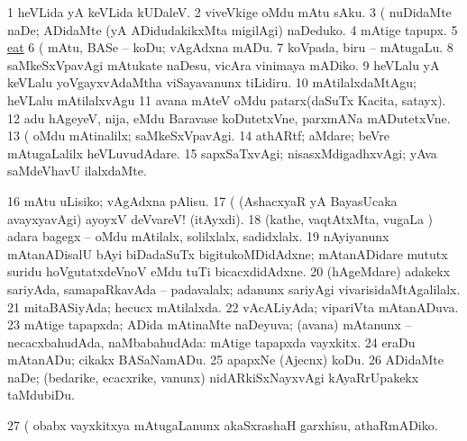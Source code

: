 \noindent
\gl{\pagu}
\expl{}
\bmng
\bnum
\num{1}  heVLida yA keVLida kUDaleV. 
\num{2}  viveVkige oMdu mAtu sAku. 
\num{3}  (  nuDidaMte naDe; ADidaMte (yA ADidudakikxMta migilAgi) naDeduko. 
\num{4}  mAtige tapupx. 
\num{5} \hyperref{kandict_e.pdf}{E}{eat nuga(7)}{eat}  
\num{6}  (  mAtu, BASe -- koDu; vAgAdxna mADu. 
\num{7}  koVpada, biru -- mAtugaLu. 
\num{8}  saMkeSxVpavAgi mAtukate naDesu, vicAra vinimaya mADiko. 
\num{9}  heVLalu yA keVLalu yoVgayxvAdaMtha viSayavanunx tiLidiru. 
\num{10}  mAtilalxdaMtAgu; heVLalu mAtilalxvAgu 
\num{11}  avana mAteV oMdu patarx(daSuTx Kacita, satayx). 
\num{12}  adu hAgeyeV, nija, eMdu Baravase koDutetxVne, parxmANa mADutetxVne. 
\num{13}  (  oMdu mAtinalilx; saMkeSxVpavAgi. 
\num{14}  athARtf; aMdare; beVre mAtugaLalilx heVLuvudAdare. 
\num{15}  sapxSaTxvAgi; nisasxMdigadhxvAgi; yAva saMdeVhavU ilalxdaMte. 
\num{16}  mAtu uLisiko; vAgAdxna pAlisu. 
\num{17}  (  (AshacxyaR yA BayasUcaka avayxyavAgi) ayoyxV deVvareV! (itAyxdi). 
\num{18}  (kathe, vaqtAtxMta, \mo vugaLa \vi) adara bagegx -- oMdu mAtilalx, solilxlalx, sadidxlalx. 
\num{19}  nAyiyanunx mAtanADisalU bAyi biDadaSuTx bigitukoMDidAdxne; mAtanADidare mututx suridu hoVgutatxdeVnoV eMdu tuTi bicacxdidAdxne. 
\num{20}  (hAgeMdare) adakekx sariyAda, samapaRkavAda -- padavalalx; adanunx sariyAgi vivarisidaMtAgalilalx. 
\num{21}  mitaBASiyAda; hecucx mAtilalxda. 
\num{22}  vAcALiyAda; vipariVta mAtanADuva. 
\num{23}  mAtige tapapxda; ADida mAtinaMte naDeyuva; (avana) mAtanunx -- necacxbahudAda, naMbabahudAda:  mAtige tapapxda vayxkitx. 
\num{24}  eraDu mAtanADu; cikakx BASaNamADu. 
\num{25}  apapxNe (Ajecnx) koDu. 
\num{26}  ADidaMte naDe; (bedarike, ecacxrike, \mo vanunx) nidARkiSxNayxvAgi kAyaRrUpakekx taMdubiDu. 
\num{27}  (  obabx vayxkitxya mAtugaLanunx akaSxrashaH garxhisu, athaRmADiko. 
